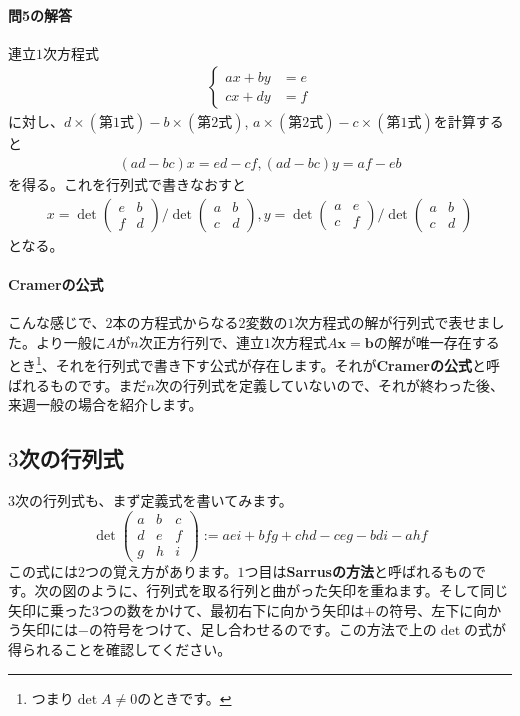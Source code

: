 \paragraph{問5の解答} 連立$1$次方程式
\begin{align*}
\begin{cases}
ax + by &= e \\
cx + dy &= f
\end{cases}
\end{align*}
に対し、$d \times (\text{第1式}) - b \times (\text{第2式})$, $a \times (\text{第2式}) - c \times (\text{第1式})$を計算すると
\begin{align*}
(ad - bc)x = ed - cf, (ad - bc)y = af - eb
\end{align*}
を得る。これを行列式で書きなおすと
\begin{align*}
x = 
\det
\begin{pmatrix}
e & b \\
f & d
\end{pmatrix}
/
\det
\begin{pmatrix}
a & b \\
c & d
\end{pmatrix}, 
y =
\det
\begin{pmatrix}
a & e \\
c & f
\end{pmatrix}
/
\det
\begin{pmatrix}
a & b \\
c & d
\end{pmatrix}
\end{align*}
となる。

\paragraph{Cramerの公式} こんな感じで、$2$本の方程式からなる$2$変数の$1$次方程式の解が行列式で表せました。より一般に$A$が$n$次正方行列で、連立$1$次方程式$A\bm{x} = \bm{b}$の解が唯一存在するとき\footnote{つまり$\det A \neq 0$のときです。}、それを行列式で書き下す公式が存在します。それが\textbf{Cramerの公式}と呼ばれるものです。まだ$n$次の行列式を定義していないので、それが終わった後、来週一般の場合を紹介します。

\subsection{$3$次の行列式}

$3$次の行列式も、まず定義式を書いてみます。
\[
\det
\begin{pmatrix}
a & b & c \\
d & e & f \\
g & h & i
\end{pmatrix}
:=  aei + bfg + chd - ceg - bdi - ahf
\]
この式には$2$つの覚え方があります。$1$つ目は\textbf{Sarrusの方法}と呼ばれるものです。次の図のように、行列式を取る行列と曲がった矢印を重ねます。そして同じ矢印に乗った$3$つの数をかけて、最初右下に向かう矢印は$+$の符号、左下に向かう矢印には$-$の符号をつけて、足し合わせるのです。この方法で上の$\det$の式が得られることを確認してください。

